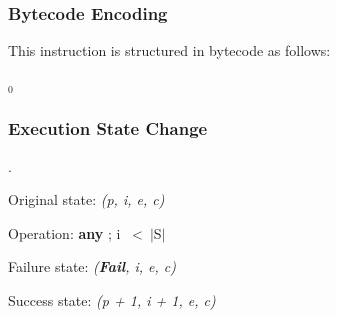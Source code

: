 \subsubsection{Bytecode Encoding}

This instruction is structured in bytecode as follows:

$_0$\ 

\subsubsection{Execution State Change}

.

Original state: \textit{(p, i, e, c)}

Operation: \textbf{any} ; i \ \textless \ $\vert$S$\vert$

Failure state: \textit{(\textbf{Fail}, i, e, c)}

Success state: \textit{(p + 1, i + 1, e, c)}


